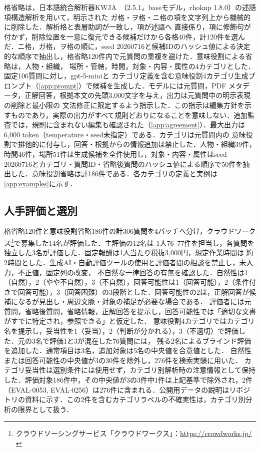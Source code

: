 \documentclass[twocolumn,a4paper,10pt]{ltjsarticle}
\begin{document}
格省略は，日本語統合解析器KWJA~\cite{ueda2023kwja}（2.5.1，baseモデル，rhoknp 1.8.0）の述語項構造解析を用いて，明示された
ガ格・ヲ格・ニ格の項を文字列上から機械的に削除した．解析格と表層助詞が一致し，項が述語へ
直接係り，項に修飾句が付かず，削除位置を一意に復元できる候補だけから各格40件，計120件を選んだ．ニ格，ガ格，ヲ格の順に，seed 20260716と候補IDのハッシュ値による決定的な順序で抽出し，格省略120件内で元質問の重複を避けた．意味役割による省略は，人物・組織，
場所・管轄，時間，対象・内容・属性の4カテゴリとした．固定106質問に対し，gpt-5-miniと
カテゴリ定義を含む意味役割4カテゴリ生成プロンプト（\ref{app:prompt}）で候補を生成した．モデルには元質問，PDF
メタデータ，正解回答，根拠本文の先頭3,000文字を与え，出力は元質問中の明示表現の削除と最小限の
文法修正に限定するよう指示した．この指示は編集方針を示すものであり，実際の出力がすべて規則どおりになることを意味しない．追加監査では，規則に含まれない編集も確認された（\ref{app:agreement}）．最大出力は6,000 token（temperature・seed未指定）である．カテゴリは元質問内の
意味役割で排他的に付与し，回答・根拠からの情報追加は禁止した．人物・組織39件，時間46件，場所51件は生成候補を全件使用し，対象・内容・属性はseed 20260716とカテゴリ・質問ID・省略後質問のハッシュ値による順序で50件を抽出した．意味役割省略は計186件である．各カテゴリの定義と実例は\ref{app:examples}に示す．

\subsection{人手評価と選別}

格省略120件と意味役割省略186件の計306質問を4バッチへ分け，クラウドワークス\footnote{\raggedright クラウドソーシングサービス「クラウドワークス」：\url{https://crowdworks.jp/}\par}で募集した14名が評価した．主評価の12名は
1人76--77件を担当し，各質問を独立した3名が評価した．固定報酬は1人当たり税抜3,000円，想定作業時間は
約2時間とした．生成AI・自動評価ツールの使用と評価者間の相談を禁止し，未入力，不正値，固定列の改変，
不自然な一律回答の有無を確認した．自然性は1（自然），2（やや不自然），3（不自然），回答可能性は1（回答可能），2（条件付きで回答可能），3（回答困難）の3段階とした．回答可能性の2は，正解回答が候補になるが見出し・周辺文脈・対象の補足が必要な場合である．
評価者には元質問，省略後質問，省略情報，正解回答を提示し，回答可能性では「適切な文書がすでに特定され，参照できる」と仮定した．
意味役割4カテゴリではカテゴリ名を提示し，妥当性を1（妥当），2（判断が分かれる），3（不適切）で評価した．元の3名で評価1と3が混在した76質問には，
残る2名によるブラインド評価を追加した．通常項目は3名，追加対象は5名の中央値を合意値とした．
自然性または回答可能性の中央値が3の30件を除外し，276件を検索実験に用いた．
カテゴリ妥当性は選別条件には使用せず，カテゴリ別解析時の注意情報として保持した．評価対象186件中，その中央値が3の3件中1件は上記基準で除外され，2件（EVAL-0053, EVAL-0256）は276件に含まれる．公開用データの説明はリポジトリの資料に示す．この2件を含むカテゴリラベルの不確実性は，カテゴリ別分析の限界として扱う．
\end{document}
